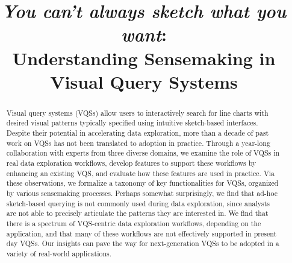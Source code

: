\documentclass[sigchi]{acmart}
\begin{document}
\title{{\em You can't always sketch what you want}: \\ Understanding Sensemaking in Visual Query Systems}


\begin{abstract}
Visual query systems (VQSs) allow users 
to interactively search for line charts
with desired visual patterns typically specified using 
intuitive sketch-based interfaces. 
Despite their potential in accelerating
data exploration, 
more than a decade of past work 
on VQSs has not been translated to 
adoption in practice. 
Through a year-long collaboration with experts 
from three diverse domains, 
we examine the role of VQSs in real
data exploration workflows,  
develop features to support these workflows by enhancing
an existing VQS,
and evaluate how these features are used in practice.
Via these observations, we formalize 
a taxonomy of key functionalities
for VQSs, organized by various sensemaking processes. 
Perhaps somewhat surprisingly, we find
that ad-hoc sketch-based querying 
is not commonly used during data exploration, since 
analysts are not able to precisely 
articulate the patterns they are interested in.
We find that there is a spectrum of
VQS-centric data exploration workflows, 
depending on the application, 
and that many 
of these workflows are not 
effectively supported in
present day VQSs.
Our insights can pave the way for 
next-generation VQSs
to be adopted in a variety 
of real-world applications.

\end{abstract}
\end{document}
